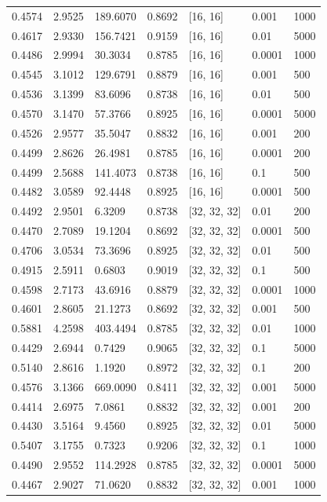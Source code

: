 \begin{tabular}{lllllll}
0.4574 & 2.9525 & 189.6070 & 0.8692 & [16, 16] & 0.001 & 1000 \\
0.4617 & 2.9330 & 156.7421 & 0.9159 & [16, 16] & 0.01 & 5000 \\
0.4486 & 2.9994 & 30.3034 & 0.8785 & [16, 16] & 0.0001 & 1000 \\
0.4545 & 3.1012 & 129.6791 & 0.8879 & [16, 16] & 0.001 & 500 \\
0.4536 & 3.1399 & 83.6096 & 0.8738 & [16, 16] & 0.01 & 500 \\
0.4570 & 3.1470 & 57.3766 & 0.8925 & [16, 16] & 0.0001 & 5000 \\
0.4526 & 2.9577 & 35.5047 & 0.8832 & [16, 16] & 0.001 & 200 \\
0.4499 & 2.8626 & 26.4981 & 0.8785 & [16, 16] & 0.0001 & 200 \\
0.4499 & 2.5688 & 141.4073 & 0.8738 & [16, 16] & 0.1 & 500 \\
0.4482 & 3.0589 & 92.4448 & 0.8925 & [16, 16] & 0.0001 & 500 \\
0.4492 & 2.9501 & 6.3209 & 0.8738 & [32, 32, 32] & 0.01 & 200 \\
0.4470 & 2.7089 & 19.1204 & 0.8692 & [32, 32, 32] & 0.0001 & 500 \\
0.4706 & 3.0534 & 73.3696 & 0.8925 & [32, 32, 32] & 0.01 & 500 \\
0.4915 & 2.5911 & 0.6803 & 0.9019 & [32, 32, 32] & 0.1 & 500 \\
0.4598 & 2.7173 & 43.6916 & 0.8879 & [32, 32, 32] & 0.0001 & 1000 \\
0.4601 & 2.8605 & 21.1273 & 0.8692 & [32, 32, 32] & 0.001 & 500 \\
0.5881 & 4.2598 & 403.4494 & 0.8785 & [32, 32, 32] & 0.01 & 1000 \\
0.4429 & 2.6944 & 0.7429 & 0.9065 & [32, 32, 32] & 0.1 & 5000 \\
0.5140 & 2.8616 & 1.1920 & 0.8972 & [32, 32, 32] & 0.1 & 200 \\
0.4576 & 3.1366 & 669.0090 & 0.8411 & [32, 32, 32] & 0.001 & 5000 \\
0.4414 & 2.6975 & 7.0861 & 0.8832 & [32, 32, 32] & 0.001 & 200 \\
0.4430 & 3.5164 & 9.4560 & 0.8925 & [32, 32, 32] & 0.01 & 5000 \\
0.5407 & 3.1755 & 0.7323 & 0.9206 & [32, 32, 32] & 0.1 & 1000 \\
0.4490 & 2.9552 & 114.2928 & 0.8785 & [32, 32, 32] & 0.0001 & 5000 \\
0.4467 & 2.9027 & 71.0620 & 0.8832 & [32, 32, 32] & 0.001 & 1000 \\

\end{tabular}
